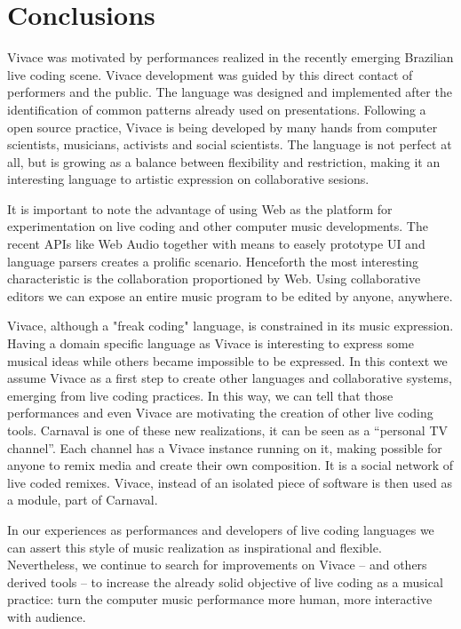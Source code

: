 \documentclass[letterpaper, 12pt]{article}
\begin{document}
\section{Conclusions}

Vivace was motivated by performances realized in the recently emerging Brazilian live coding scene. Vivace development was guided by this direct contact of performers and the public. The language was designed and implemented after the identification of common patterns already used on presentations. Following a open source practice, Vivace is being developed by many hands from computer scientists, musicians, activists and social scientists. The language is not perfect at all, but is growing as a balance between flexibility and restriction, making it an interesting language to artistic expression on collaborative sesions.

It is important to note the advantage of using Web as the platform for experimentation on live coding and other computer music developments. The recent APIs like Web Audio together with means to easely prototype UI and language parsers creates a prolific scenario. Henceforth the most interesting characteristic is the collaboration proportioned by Web. Using collaborative editors we can expose an entire music program to be edited by anyone, anywhere.

Vivace, although a "freak coding" language, is constrained in its music expression. Having a domain specific language as Vivace is interesting to express some musical ideas while others became impossible to be expressed. In this context we assume Vivace as a first step to create other languages and collaborative systems, emerging from live coding practices. In  this way, we can tell that those performances and even Vivace are motivating the creation of other live coding tools. Carnaval is one of  these new realizations, it can be seen as a ``personal TV channel''. Each channel has a Vivace instance running on it, making possible for anyone to remix media and create their own composition. It is a social network of live coded remixes. Vivace, instead of an isolated piece of software is then used as a module, part of Carnaval.

In our experiences as performances and developers of live coding languages we can assert this style of music realization as inspirational and flexible. Nevertheless, we continue to search for improvements on Vivace -- and others derived tools -- to increase the already solid objective of live coding as a musical practice: turn the computer music performance more human, more interactive with audience.




\end{document}
